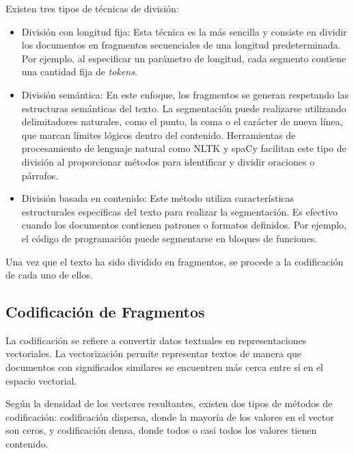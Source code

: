 \documentclass{article}
\begin{document}
Existen tres tipos de técnicas de división:
\begin{itemize}
    \item División con longitud fija: Esta técnica es la más sencilla y consiste en dividir los documentos en fragmentos secuenciales de una longitud predeterminada. Por ejemplo, al especificar un parámetro de longitud, cada segmento contiene una cantidad fija de \textit{tokens}.
    \item División semántica: En este enfoque, los fragmentos se generan respetando las estructuras semánticas del texto. La segmentación puede realizarse utilizando delimitadores naturales, como el punto, la coma o el carácter de nueva línea, que marcan límites lógicos dentro del contenido. Herramientas de procesamiento de lenguaje natural como NLTK \cite{nltk2001} y spaCy \cite{spacy2016} facilitan este tipo de división al proporcionar métodos para identificar y dividir oraciones o párrafos.
    \item División basada en contenido: Este método utiliza características estructurales específicas del texto para realizar la segmentación. Es efectivo cuando los documentos contienen patrones o formatos definidos. Por ejemplo, el código de programación puede segmentarse en bloques de funciones.
\end{itemize}

Una vez que el texto ha sido dividido en fragmentos, se procede a la codificación de cada uno de ellos.

\subsection{Codificación de Fragmentos}

La codificación se refiere a convertir datos textuales en representaciones vectoriales. La vectorización permite representar textos de manera que documentos con significados similares se encuentren más cerca entre sí en el espacio vectorial. 

Según la densidad de los vectores resultantes, existen dos tipos de métodos de codificación: codificación dispersa, donde la mayoría de los valores en el vector son ceros, y codificación densa, donde todos o casi todos los valores tienen contenido.
\end{document}
